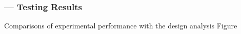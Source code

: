 \subsubsection*{ --- Testing Results}
Comparisons of experimental performance with the design analysis Figure 